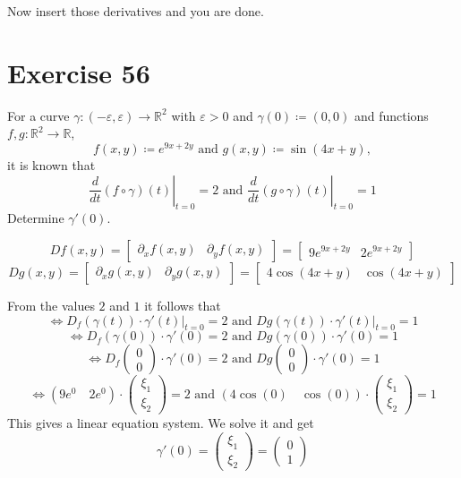 \documentclass[a4paper]{article}
\theoremstyle{definition}
\begin{document}
Now insert those derivatives and you are done.

\section{Exercise 56}
\begin{ex}
  For a curve $\gamma: (-\varepsilon, \varepsilon) \to \mathbb R^2$ with $\varepsilon > 0$ and $\gamma(0) \coloneqq (0, 0)$
  and functions $f, g: \mathbb R^2 \to \mathbb R$,
  \[ f(x,y) \coloneqq e^{9x + 2y} \text{ and } g(x, y) \coloneqq \sin(4x + y), \]
  it is known that
  \[ \left. \frac{d}{dt} (f \circ \gamma)(t) \right|_{t=0} = 2 \text{ and } \left. \frac{d}{dt} (g \circ \gamma)(t) \right|_{t=0} = 1 \]
  Determine $\gamma'(0)$.
\end{ex}

\[ Df(x, y) = \begin{bmatrix} \partial_x f(x, y) & \partial_y f(x, y) \end{bmatrix} = \begin{bmatrix} 9e^{9x+2y}    & 2e^{9x+2y} \end{bmatrix} \]
\[ Dg(x, y) = \begin{bmatrix} \partial_x g(x, y) & \partial_y g(x, y) \end{bmatrix} = \begin{bmatrix} 4\cos(4x+y) & \cos(4x+y) \end{bmatrix} \]

From the values $2$ and $1$ it follows that
\[ \iff \left. D_f(\gamma(t)) \cdot \gamma'(t) \right|_{t=0} = 2 \text{ and } \left. Dg(\gamma(t)) \cdot \gamma'(t) \right|_{t=0} = 1 \]
\[ \iff D_f(\gamma(0)) \cdot \gamma'(0) = 2 \text{ and } Dg(\gamma(0)) \cdot \gamma'(0) = 1 \]
\[ \iff D_f\begin{pmatrix} 0 \\ 0 \end{pmatrix} \cdot \gamma'(0) = 2 \text{ and } Dg\begin{pmatrix} 0 \\ 0 \end{pmatrix} \cdot \gamma'(0) = 1 \]
\[ \iff (9e^0 \quad 2e^0) \cdot \begin{pmatrix} \xi_1 \\ \xi_2 \end{pmatrix} = 2 \text{ and } (4 \cos(0) \quad \cos(0)) \cdot \begin{pmatrix} \xi_1 \\ \xi_2 \end{pmatrix} = 1 \]
This gives a linear equation system. We solve it and get
\[ \gamma'(0) = \begin{pmatrix} \xi_1 \\ \xi_2 \end{pmatrix} = \begin{pmatrix} 0 \\ 1 \end{pmatrix} \]
\end{document}
